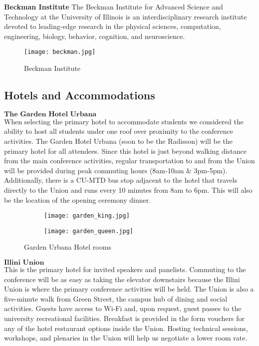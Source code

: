 \textbf{Beckman Institute}
The Beckman Institute for Advanced Science and Technology at the University of Illinois is an interdisciplinary research institute devoted to leading-edge research in the physical sciences, computation, engineering, biology, behavior, cognition, and neuroscience.\\

\begin{figure}[H]
	\centering
	\texttt{[image: beckman.jpg]}
	\caption{Beckman Institute}
	\label{fig:beckman}
\end{figure}

\newpage
\subsection{Hotels and Accommodations}

$\textbf{The Garden Hotel Urbana}$\\
When selecting the primary hotel to accommodate students we considered the ability to host all students under one roof over proximity to the conference activities. The Garden Hotel Urbana (soon to be the Radisson) will be the primary hotel for all attendees. Since this hotel is just beyond walking distance from the main conference activities, regular transportation to and from the Union will be provided during peak commuting hours (8am-10am $\&$ 3pm-5pm). Additionally, there is a CU-MTD bus stop adjacent to the hotel that travels directly to the Union and runs every 10 minutes from 8am to 6pm. This will also be the location of the opening ceremony dinner.\\ 
\begin{figure}[H]
	\centering
	\begin{subfigure}{0.5\textwidth}
		\centering
		\texttt{[image: garden\_king.jpg]}
	\end{subfigure}%
	\begin{subfigure}{0.5\textwidth}
		\centering
		\texttt{[image: garden\_queen.jpg]}
	\end{subfigure}
	\caption{Garden Urbana Hotel rooms}		
\end{figure} 

$\textbf{Illini Union}$\\
This is the primary hotel for invited speakers and panelists. Commuting to the conference will be as easy as taking the elevator downstairs because the Illini Union is where the primary conference activities will be held. The Union is also a five-minute walk from Green Street, the campus hub of dining and social activities. Guests have access to Wi-Fi and, upon request, guest passes to the university recreational facilities. Breakfast is provided in the form vouchers for any of the hotel restaurant options inside the Union. Hosting technical sessions, workshops, and plenaries in the Union will help us negotiate a lower room rate.\\

